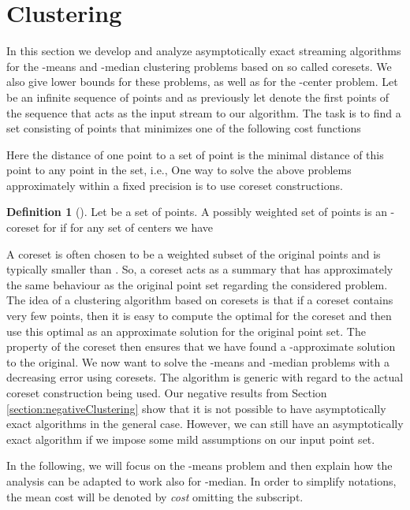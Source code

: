 \documentclass[a4paper,11pt,oneside,english,onecolumn]{article}
\theoremstyle{definition}
\newtheorem{definition}[theorem]{Definition}
\begin{document}
\section{Clustering}
\label{section:Clustering}

In this section we develop and analyze asymptotically exact streaming algorithms for the -means and -median clustering problems based on so called coresets. We also give lower bounds for these problems, as well as for the -center problem. Let  be an infinite sequence of points and as previously let  denote the first  points of the sequence that acts as the input stream to our algorithm. The task is to find a set  consisting of  points that minimizes one of the following cost functions

Here the distance of one point to a set of point is the minimal distance of this point to any point in the set, i.e.,  One way to solve the above problems approximately within a fixed precision is to use coreset constructions.
\begin{definition}[\cite{HPClustering}]
Let  be a set of points. A possibly weighted set of points  is an -coreset for  if for any set  of  centers we have 
\end{definition}
A coreset is often chosen to be a weighted subset of the original points and is typically smaller than . So, a coreset acts as a summary that has approximately the same behaviour as the original point set regarding the considered problem.
The idea of a clustering algorithm based on coresets is that if a coreset contains very few points, then it is easy to compute the optimal for the coreset and then use this optimal as an approximate solution for the original point set. The property of the coreset then ensures that we have found a -approximate solution to the original.
We now want to solve the -means and -median problems with a decreasing error using coresets. The algorithm is generic with regard to the actual coreset construction being used. Our negative results from Section \ref{section:negativeClustering} show that it is not possible to have asymptotically exact algorithms in the general case. However, we can still have an asymptotically exact algorithm if we impose some mild assumptions on our input point set.

In the following, we will focus on the -means problem and then explain how the analysis can be adapted to work also for -median. In order to simplify notations, the mean cost will be denoted by \emph{cost} omitting the subscript.
\end{document}
